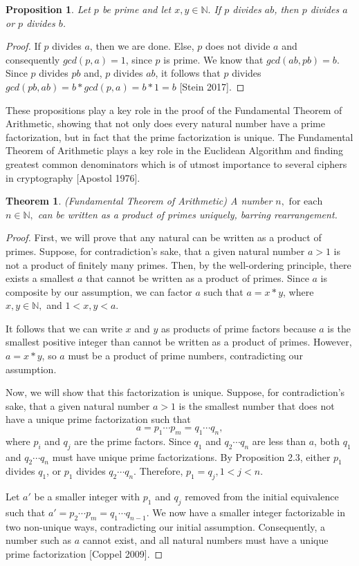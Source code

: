 \documentclass[11pt]{article}
\newtheorem{thm}{Theorem}[section]
\newtheorem{prop}{Proposition}[section]
\begin{document}
\begin{prop} 
Let $p$ be prime and let $x,y \in \mathbb{N}.$  If $p$ divides $ab$, then $p$ divides $a$ or $p$ divides $b$.
\end{prop}
\begin{proof}
If $p$ divides $a$, then we are done. Else, $p$ does not divide $a$ and consequently $gcd(p, a) = 1$,
since $p$ is prime. We know that $gcd(ab,pb) = b$. Since $p$ divides $pb$ and, $p$ divides $ab$, it follows that $p$ divides $gcd(pb, ab) = b*gcd(p, a) = b*1 = b$ [Stein 2017]. 
\end{proof}

These propositions play a key role in the proof of the Fundamental Theorem of Arithmetic, showing that not only does every natural number have a prime factorization, but in fact that the prime factorization is unique. The Fundamental Theorem of Arithmetic plays a key role in the Euclidean Algorithm and finding greatest common denominators which is of utmost importance to several ciphers in cryptography [Apostol 1976].
 
\begin{thm}
\emph{(Fundamental Theorem of Arithmetic)}
A number $n, \mbox{ for each }$ \\ $n \in \mathbb{N},$ can be written as a product of primes uniquely, barring rearrangement.
\end{thm}
\begin{proof}
First, we will prove that any natural can be written as a product of primes. Suppose, for contradiction's sake, that a given natural number $a > 1$ is not a product of finitely many primes. Then, by the well-ordering principle, there exists a smallest $a$ that cannot be written as a product of primes. Since $a$ is composite by our assumption, we can factor $a$ such that $a = x*y$, where $x,y \in \mathbb{N},$ and $1 < x,y < a$. 

It follows that we can write $x$ and $y$ as products of prime factors because $a$ is the smallest positive integer than cannot be written as a product of primes. However, $a = x*y$, so $a$ must be a product of prime numbers, contradicting our assumption.

Now, we will show that this factorization is unique. Suppose, for contradiction's sake, that a given natural number $a > 1$ is the smallest number that does not have a unique prime factorization such that $$a = p_1 \cdots p_m = q_1 \cdots q_n,$$ where $p_i$ and $q_j$ are the prime factors. Since $q_1$ and $q_2 \cdots q_n$ are less than $a$, both $q_1$ and $q_2 \cdots q_n$ must have unique prime factorizations.  By Proposition 2.3, either $p_1$ divides $q_1$, or $p_1$ divides $q_2 \cdots q_n$. Therefore, $p_1 = q_j, 1 < j < n.$

Let $a'$ be a smaller integer with $p_1$ and $q_j$ removed from the initial equivalence such that $a' = p_2 \cdots p_m = q_1 \cdots q_{n-1}.$ We now have a smaller integer factorizable in two non-unique ways, contradicting our initial assumption. Consequently, a number such as $a$ cannot exist, and all natural
numbers must have a unique prime factorization [Coppel 2009].
\end{proof}
\end{document}

